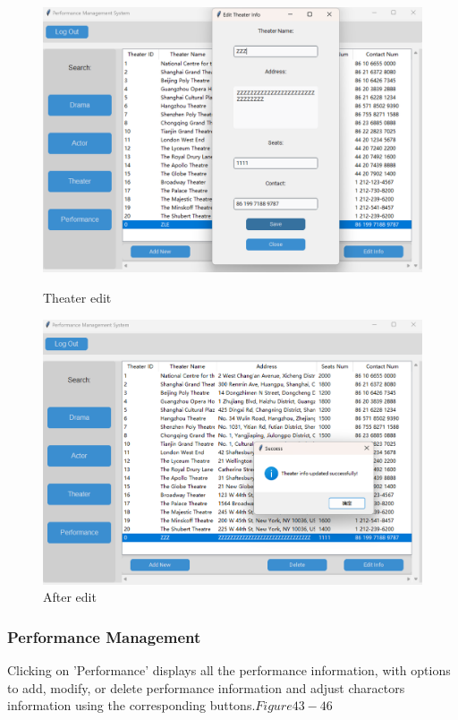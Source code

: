 \documentclass[12pt]{article}
\begin{document}
\begin{figure}[H]
    \centering
    \begin{minipage}{0.48\textwidth}
        \centering
        \includegraphics[width=\textwidth]{41.png}
        \caption{Theater edit} 
        \label{Figure 41}
    \end{minipage}
    \hfill
    \begin{minipage}{0.48\textwidth}
        \centering
        \includegraphics[width=\textwidth]{42.png}
        \caption{After edit}
        \label{Figure 42}
    \end{minipage}
\end{figure}

\subsubsection{Performance Management}
\par Clicking on 'Performance' displays all the performance information, with options to add, modify, or delete performance information and adjust charactors information using the corresponding buttons.\(Figure43-46\)
\end{document}
